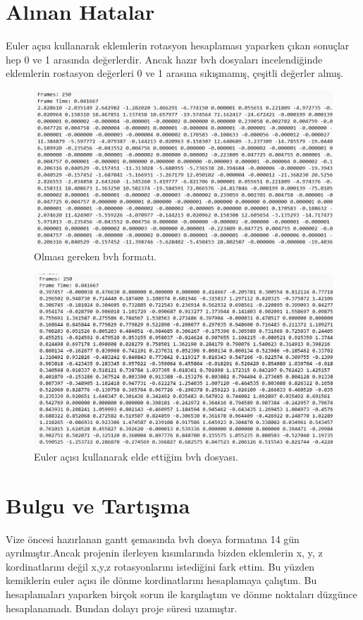 \documentclass[12pt, a4paper]{article}
\begin{document}
\section{Alınan Hatalar}
Euler açısı kullanarak eklemlerin rotasyon hesaplaması yaparken çıkan sonuçlar hep 0 ve 1 arasında değerlerdir. Ancak hazır bvh dosyaları incelendiğinde eklemlerin rostasyon değerleri 0 ve 1 arasına sıkışmamış, çeşitli değerler almış.


 \begin{figure}[h]
	\centering
	\includegraphics[width=12 cm , height = 7 cm ]{hata1.png}
	\caption{Olması gereken bvh formatı.}
\end{figure}

\begin{figure}[h]
	\centering
	\includegraphics[width=12 cm , height = 6 cm ]{hata2.png}
	\caption{Euler açısı kullanarak elde ettiğim bvh dosyası.}
\end{figure}
\section{Bulgu ve Tartışma}
Vize öncesi hazırlanan gantt şemasında bvh dosya formatına 14 gün ayrılmıştır.Ancak projenin ilerleyen kısımlarında bizden eklemlerin x, y, z kordinatlarını değil x,y,z rotasyonlarını istediğini fark ettim. Bu yüzden kemiklerin euler açısı ile dönme kordinatlarını hesaplamaya çalıştım. Bu hesaplamaları yaparken birçok sorun ile karşılaştım ve dönme noktaları düzgünce hesaplanamadı. Bundan dolayı proje süresi uzamıştır. 
\end{document}
